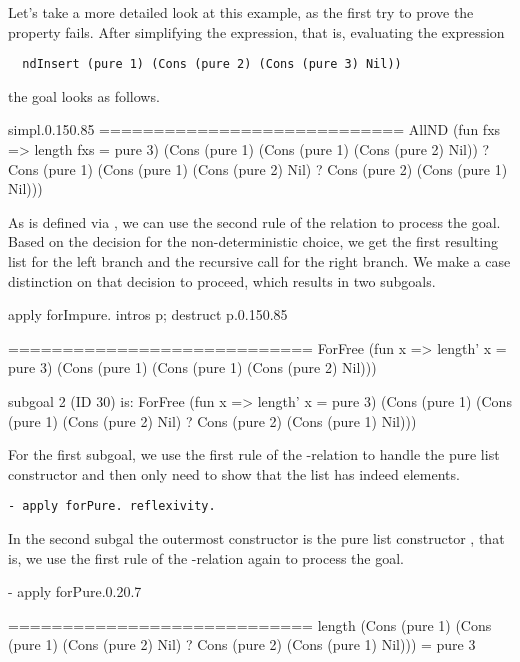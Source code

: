 Let's take a more detailed look at this example, as the first try to prove the property fails.
After simplifying the expression, that is, evaluating the expression
\begin{verbatim}
  ndInsert (pure 1) (Cons (pure 2) (Cons (pure 3) Nil))
\end{verbatim}
the goal looks as follows.

\begin{cproof1}{simpl.}{0.15}{0.85}
  ============================
  AllND (fun fxs => length fxs = pure 3)
        (Cons (pure 1) (Cons (pure 1) (Cons (pure 2) Nil))
        ? Cons (pure 1) (Cons (pure 1) (Cons (pure 2) Nil)
        ? Cons (pure 2) (Cons (pure 1) Nil)))
\end{cproof1}

As  is defined via , we can use the second rule of the relation to process the goal.
Based on the decision for the non-deterministic choice, we get the first resulting list for the left branch and the recursive call for the right branch.
We make a case distinction on that decision to proceed, which results in two subgoals.

\begin{cproof1}{apply forImpure. intros p; destruct p.}{0.15}{0.85}

  ============================
  ForFree (fun x => length' x = pure 3)
          (Cons (pure 1) (Cons (pure 1) (Cons (pure 2) Nil)))

subgoal 2 (ID 30) is:
  ForFree (fun x => length' x = pure 3)
          (Cons (pure 1) (Cons (pure 1) (Cons (pure 2) Nil)
          ? Cons (pure 2) (Cons (pure 1) Nil)))
\end{cproof1}

For the first subgoal, we use the first rule of the -relation to handle the pure list constructor and then only need to show that the list has indeed  elements.

\begin{verbatim}
- apply forPure. reflexivity.
\end{verbatim}

In the second subgal the outermost constructor is the pure list constructor , that is, we use the first rule of the -relation again to process the goal.

\begin{cproof1}{- apply forPure.}{0.2}{0.7}

  ============================
  length (Cons (pure 1) (Cons (pure 1) (Cons (pure 2) Nil)
         ? Cons (pure 2) (Cons (pure 1) Nil)))
  = pure 3
\end{cproof1}

